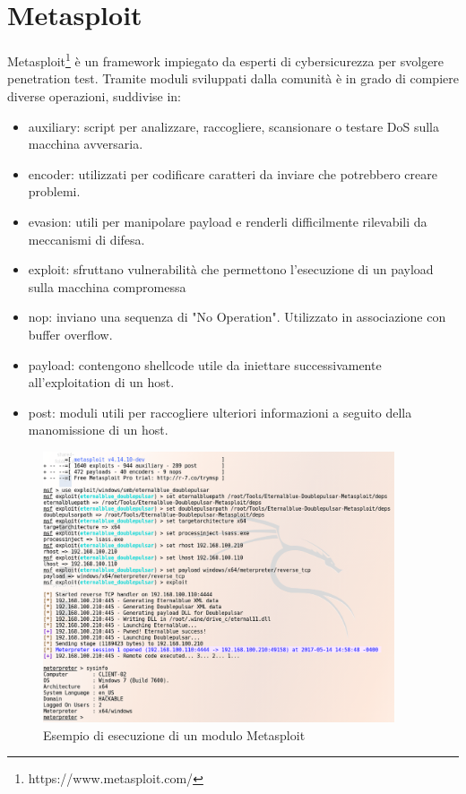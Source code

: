 \documentclass[12pt]{report}
\begin{document}
\section{Metasploit}

Metasploit\footnote{https://www.metasploit.com/} è un framework impiegato da esperti di cybersicurezza per svolgere penetration test. Tramite moduli sviluppati dalla comunità è in grado di compiere diverse operazioni, suddivise in:
\begin{itemize}
    \item auxiliary: script per analizzare, raccogliere, scansionare o testare DoS sulla macchina avversaria.
    \item encoder: utilizzati per codificare caratteri da inviare che potrebbero creare problemi.
    \item evasion: utili per manipolare payload e renderli difficilmente rilevabili da meccanismi di difesa.
    \item exploit: sfruttano vulnerabilità che permettono l'esecuzione di un payload sulla macchina compromessa
    \item nop: inviano una sequenza di "No Operation". Utilizzato in associazione con buffer overflow.
    \item payload: contengono shellcode utile da iniettare successivamente all'exploitation di un host.
    \item post: moduli utili per raccogliere ulteriori informazioni a seguito della manomissione di un host.
\end{itemize}

\begin{figure}[htbp]
	\centering
	\includegraphics[width = 28em]{immagini/metasploit.png}
	\caption{Esempio di esecuzione di un modulo Metasploit}
	\label{fig:nmap}
\end{figure}
\end{document}
